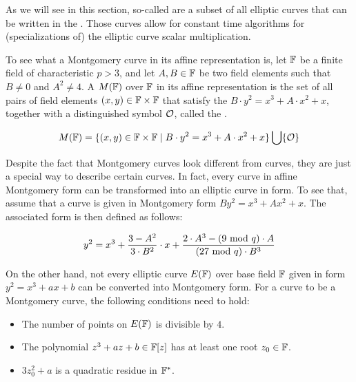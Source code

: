 As we will see in this section, so-called  are a subset of all elliptic curves that can be written in the . Those curves allow for constant time algorithms for (specializations of) the elliptic curve scalar multiplication. 

To see what a Montgomery curve in its affine representation is, let $\mathbb{F}$ be a finite field of characteristic $p>3$, and let $A,B\in \mathbb{F}$ be two field elements such that $B\neq 0$ and $A^2 \neq 4$.  A  $M(\mathbb{F})$ over $\mathbb{F}$ in its affine representation is the set of all pairs of field elements $(x,y)\in \mathbb{F}\times \mathbb{F}$ that satisfy the  $B\cdot y^2 = x^3 + A\cdot x^2 + x$, together with a distinguished symbol $\mathcal{O}$, called the .

\begin{equation}
\label{eq:montgomery-curve}
M(\mathbb{F}) = \{(x,y)\in \mathbb{F}\times \mathbb{F}\;|\; B\cdot y^2 = x^3 + A\cdot x^2 + x  \} \bigcup \{\mathcal{O}\}
\end{equation}

Despite the fact that Montgomery curves look different from  curves, they are just a special way to describe certain  curves. In fact, every curve in affine Montgomery form can be transformed into an elliptic curve in  form. To see that, assume that a curve is given in Montgomery form $B y^2 = x^3 + A x^2 + x$. The associated  form is then defined as follows:

\begin{equation}\label{eq:montgomery-to-weierstrass}
y^2 = x^3 + \frac{3-A^2}{3\cdot B^2}\cdot x + \frac{2\cdot A^3-(9 \text{ mod } q)\cdot A}{(27 \text{ mod } q)\cdot B^3}
\end{equation}

On the other hand, not every elliptic curve $E(\mathbb{F})$ over base field $\mathbb{F}$ given in  form $y^2 = x^3 + a x + b$ can be converted into Montgomery form. For a  curve to be a Montgomery curve, the following conditions need to hold:

\begin{definition}\label{def:montgomery}

\begin{itemize}
\item The number of points on $E(\mathbb{F})$ is divisible by $4$.
\item The polynomial $z^3 + a z + b \in \mathbb{F}[z]$ has at least one root $z_0\in\mathbb{F}$.
\item $3z_0^2 + a$ is a quadratic residue in $\mathbb{F}^*$.
\end{itemize}
\end{definition}


